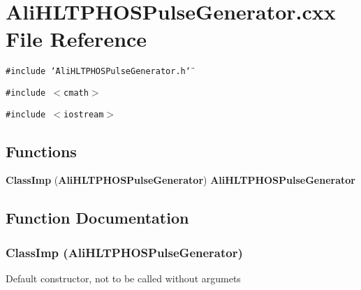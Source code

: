 \section{Ali\-HLTPHOSPulse\-Generator.cxx File Reference}
\label{AliHLTPHOSPulseGenerator_8cxx}
{\tt \#include \char`\"{}Ali\-HLTPHOSPulse\-Generator.h\char`\"{}}\par
{\tt \#include $<$cmath$>$}\par
{\tt \#include $<$iostream$>$}\par
\subsection*{Functions}
\begin{CompactItemize}
\item 
{\bf Class\-Imp} ({\bf Ali\-HLTPHOSPulse\-Generator}) {\bf Ali\-HLTPHOSPulse\-Generator}
\end{CompactItemize}


\subsection{Function Documentation}
\subsubsection{\setlength{\rightskip}{0pt plus 5cm}Class\-Imp ({\bf Ali\-HLTPHOSPulse\-Generator})}\label{AliHLTPHOSPulseGenerator_8cxx_a0}


Default constructor, not to be called without argumets 